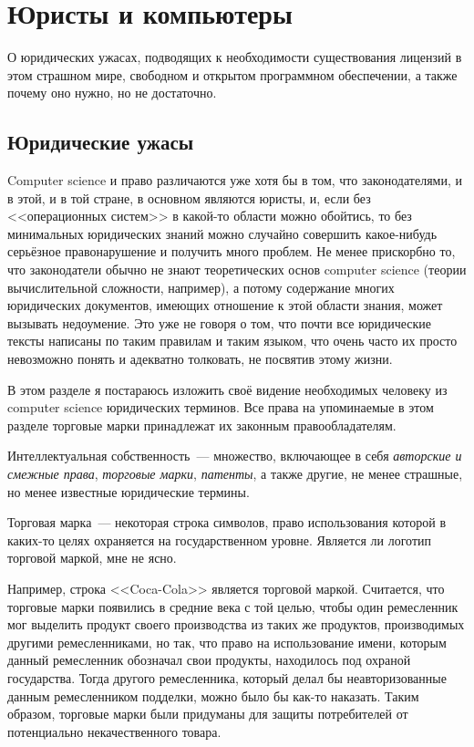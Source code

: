 \chapter{Юристы и компьютеры}

О юридических ужасах, подводящих к необходимости существования лицензий в этом страшном мире, свободном и открытом программном обеспечении, а также почему оно нужно, но не достаточно.

\section{Юридические ужасы}

Computer science и право различаются уже хотя бы в том, что законодателями, и в этой, и в той стране, в основном являются юристы, и, если без <<операционных систем>> в какой-то области можно обойтись, то без минимальных юридических знаний можно случайно совершить какое-нибудь серьёзное правонарушение и получить много проблем.
Не менее прискорбно то, что законодатели обычно не знают теоретических основ computer science (теории вычислительной сложности, например), а потому содержание многих юридических документов, имеющих отношение к этой области знания, может вызывать недоумение.
Это уже не говоря о том, что почти все юридические тексты написаны по таким правилам и таким языком, что очень часто их просто невозможно понять и адекватно толковать, не посвятив этому жизни.

В этом разделе я постараюсь изложить своё видение необходимых человеку из computer science юридических терминов.
Все права на упоминаемые в этом разделе торговые марки принадлежат их законным правообладателям.

\begin{definition}
Интеллектуальная собственность~--- множество, включающее в себя \emph{авторские и смежные права}, \emph{торговые марки}, \emph{патенты}, а также другие, не менее страшные, но менее известные юридические термины.
\end{definition}

\begin{definition}
Торговая марка~--- некоторая строка символов, право использования которой в каких-то целях охраняется на государственном уровне. Является ли логотип торговой маркой, мне не ясно.
\end{definition}

Например, строка <<Coca-Cola>> является торговой маркой.
Считается, что торговые марки появились в средние века с той целью, чтобы один ремесленник мог выделить продукт своего производства из таких же продуктов, производимых другими ремесленниками, но так, что право на использование имени, которым данный ремесленник обозначал свои продукты, находилось под охраной государства.
Тогда другого ремесленника, который делал бы неавторизованные данным ремесленником подделки, можно было бы как-то наказать.
Таким образом, торговые марки были придуманы для защиты потребителей от потенциально некачественного товара.

